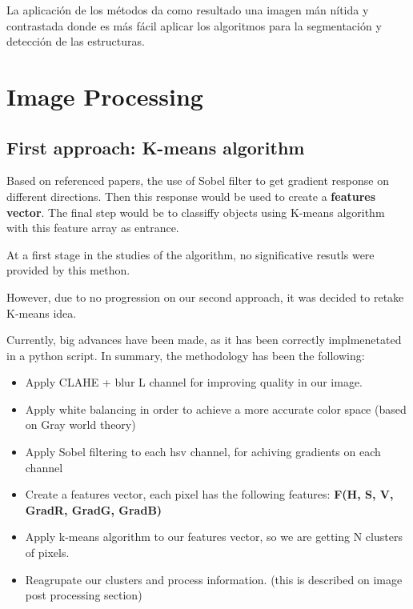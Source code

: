 \documentclass[12pt, a4paper]{article}
\begin{document}
La aplicación de los métodos da como resultado una imagen mán nítida y contrastada
 donde es más fácil aplicar los algoritmos para la segmentación y detección de las estructuras.


\section{Image Processing}

\subsection{First approach: K-means algorithm}


Based on referenced papers, the use of Sobel filter to get gradient response on different directions. Then 
this response would be used to create a \textbf{features vector}. The final step would be to classiffy objects 
using K-means algorithm with this feature array as entrance. 



At a first stage in the studies of the algorithm, no significative resutls were provided by this methon. 

However, due to no progression on our second approach, it was decided to retake K-means idea. 

Currently, big advances have been made, as it has been correctly implmenetated in a python script. In summary, 
the methodology has been the following: 

\begin{itemize}
    \item Apply CLAHE + blur L channel for improving quality in our image.
    \item Apply white balancing in order to achieve a more accurate color space (based on Gray world theory)
    \item Apply Sobel filtering to each hsv channel, for achiving gradients on each channel
    \item Create a features vector, each pixel has the following features: \textbf{F(H, S, V, GradR, GradG, GradB)}
    \item Apply k-means algorithm to our features vector, so we are getting N clusters of pixels. 
    \item Reagrupate our clusters and process information. (this is described on image post processing section)
\end{itemize}
\end{document}
